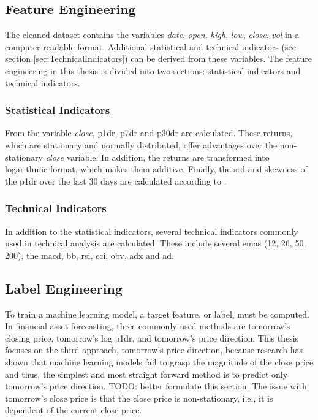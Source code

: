 \subsection{Feature Engineering}
\label{sub:Feature_Engineering}
The cleaned dataset contains the variables \textit{date}, \textit{open}, \textit{high}, \textit{low}, \textit{close}, \textit{vol} in a computer readable format. Additional statistical and technical indicators (see section \ref{sec:TechnicalIndicators}) can be derived from these variables. The feature engineering in this thesis is divided into two sections: statistical indicators and technical indicators.

\subsubsection{Statistical Indicators}
\label{subsub:Statistical_Indicators}
From the variable \textit{close}, \gls{p1dr}, \gls{p7dr} and \gls{p30dr} are calculated. These returns, which are stationary and normally distributed, offer advantages over the non-stationary \textit{close} variable. In addition, the returns are transformed into logarithmic format, which makes them additive. Finally, the \gls{std} and skewness of the \gls{p1dr} over the last 30 days are calculated according to \cite{liu2023forecasting}.

\subsubsection{Technical Indicators}
\label{subsub:Technical_Indicators}
In addition to the statistical indicators, several technical indicators commonly used in technical analysis are calculated. These include several \glspl{ema} (12, 26, 50, 200), the \gls{macd}, \gls{bb}, \gls{rsi}, \gls{cci}, \gls{obv}, \gls{adx} and \gls{ad}.

\subsection{Label Engineering}
\label{sub:Label_Engineering}
To train a machine learning model, a target feature, or label, must be computed. In financial asset forecasting, three commonly used methods are tomorrow's closing price, tomorrow's log \gls{p1dr}, and tomorrow's price direction. This thesis focuses on the third approach, tomorrow's price direction, because research has shown that machine learning models fail to grasp the magnitude of the close price and thus, the simplest and most straight forward method is to predict only tomorrow's price direction. TODO: better formulate this section. The issue with tomorrow's close price is that the close price is non-stationary, i.e., it is dependent of the current close price.

